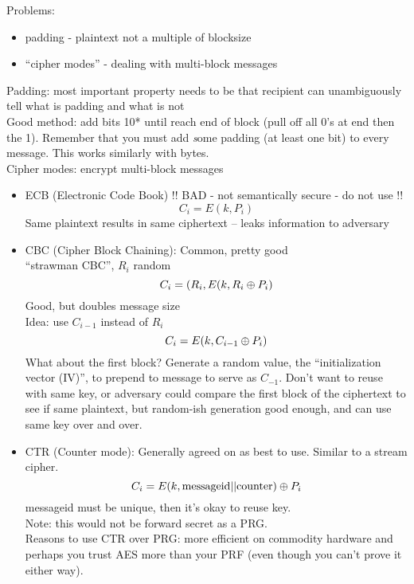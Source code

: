 Problems:
\begin{itemize}
    \item padding - plaintext not a multiple of blocksize
    \item ``cipher modes'' - dealing with multi-block messages
\end{itemize}

Padding: most important property needs to be that recipient can unambiguously
    tell what is padding and what is not\\

    Good method: add bits 10* until reach end of block (pull off all 0's at end
    then the 1). Remember that you must add {\emph some} padding (at least one
    bit) to every message. This works similarly with bytes.\\

\bigskip
Cipher modes: encrypt multi-block messages
\begin{itemize}
    \item ECB (Electronic Code Book) !! BAD - not semantically secure - do not use !!
        $$C_i = E(k, P_i)$$
        Same plaintext results in same ciphertext -- leaks information to
        adversary
    \item CBC (Cipher Block Chaining): Common, pretty good\\
        ``strawman CBC'', $R_i$ random
        $$C_i = (R_i, E(k, R_i \oplus P_i)$$
        Good, but doubles message size\\
        Idea: use $C_{i-1}$ instead of $R_i$\\
        $$C_i = E(k, C_{i-1} \oplus P_i)$$
        What about the first block? Generate a random value, the
        ``initialization vector (IV)'', to prepend to message to serve as
        $C_{-1}$. Don't want to reuse with same key, or adversary could compare
        the first block of the ciphertext to see if same plaintext, but
        random-ish generation good enough, and can use same key over and over.
    \item CTR (Counter mode): Generally agreed on as best to use.
        Similar to a stream cipher.
        $$C_i = E(k, \text{messageid} || \text{counter}) \oplus P_i$$
        messageid must be unique, then it's okay to reuse key.\\
        Note: this would not be forward secret as a PRG.\\
        Reasons to use CTR over PRG: more efficient on commodity hardware and
        perhaps you trust AES more than your PRF (even though you can't prove it
        either way).
\end{itemize}
